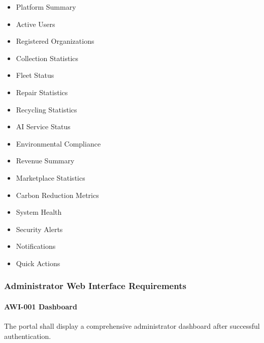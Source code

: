 \begin{itemize}

\item Platform Summary

\item Active Users

\item Registered Organizations

\item Collection Statistics

\item Fleet Status

\item Repair Statistics

\item Recycling Statistics

\item AI Service Status

\item Environmental Compliance

\item Revenue Summary

\item Marketplace Statistics

\item Carbon Reduction Metrics

\item System Health

\item Security Alerts

\item Notifications

\item Quick Actions

\end{itemize}


\subsubsection*{Administrator Web Interface Requirements}

\paragraph{AWI-001 Dashboard}

The portal shall display a comprehensive administrator dashboard after
successful authentication.

